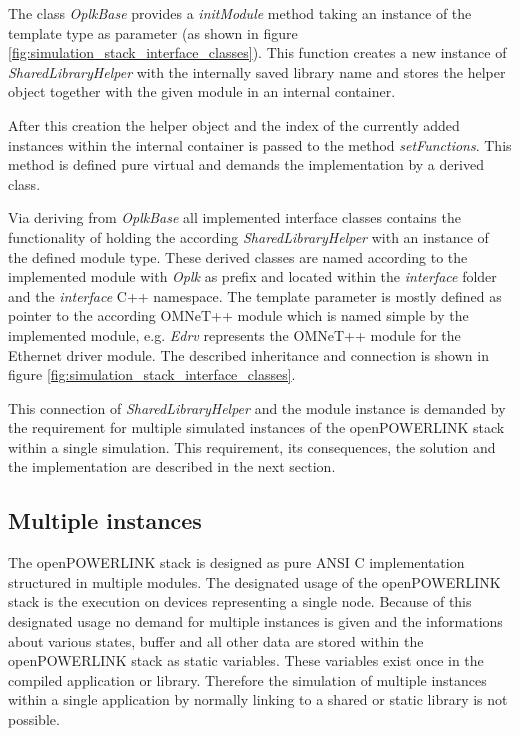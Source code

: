 The class \emph{OplkBase} provides a \emph{initModule} method taking an instance of the template type as parameter (as shown in figure \ref{fig:simulation_stack_interface_classes}).
This function creates a new instance of \emph{SharedLibraryHelper} with the internally saved library name and stores the helper object together with the given module in an internal container.

After this creation the helper object and the index of the currently added instances within the internal container is passed to the method \emph{setFunctions}.
This method is defined pure virtual and demands the implementation by a derived class.

Via deriving from \emph{OplkBase} all implemented interface classes contains the functionality of holding the according \emph{SharedLibraryHelper} with an instance of the defined module type.
These derived classes are named according to the implemented module with \emph{Oplk} as prefix and located within the \emph{interface} folder and the \emph{interface} C++ namespace.
The template parameter is mostly defined as pointer to the according OMNeT++ module which is named simple by the implemented module, e.g. \emph{Edrv} represents the OMNeT++ module for the Ethernet driver module.
The described inheritance and connection is shown in figure \ref{fig:simulation_stack_interface_classes}.

This connection of \emph{SharedLibraryHelper} and the module instance is demanded by the requirement for multiple simulated instances of the openPOWERLINK stack within a single simulation.
This requirement, its consequences, the solution and the implementation are described in the next section.

\subsection{Multiple instances}
\label{sec:porting_stack_multiinstance}
The openPOWERLINK stack is designed as pure ANSI C implementation structured in multiple modules.
The designated usage of the openPOWERLINK stack is the execution on devices representing a single node.
Because of this designated usage no demand for multiple instances is given and the informations about various states, buffer and all other data are stored within the openPOWERLINK stack as static variables.
These variables exist once in the compiled application or library.
Therefore the simulation of multiple instances within a single application by normally linking to a shared or static library is not possible.

